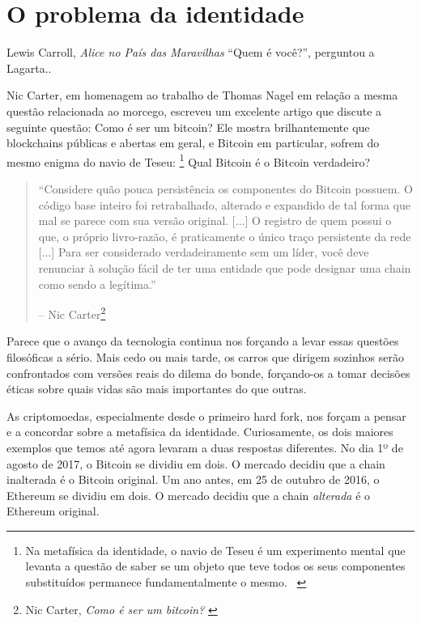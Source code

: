 \chapter{O problema da identidade}
\label{les:4}

\begin{chapquote}{Lewis Carroll, \textit{Alice no País das Maravilhas}}
  \enquote{Quem é você?}, perguntou a Lagarta..
\end{chapquote}

Nic Carter, em homenagem ao trabalho de Thomas Nagel em relação a mesma questão relacionada ao morcego, escreveu um excelente artigo que discute a seguinte questão: Como é ser um bitcoin? Ele mostra brilhantemente que blockchains públicas e abertas em geral, e Bitcoin em particular, sofrem do mesmo enigma do navio de Teseu: \footnote{Na metafísica da identidade, o navio de Teseu é um experimento mental que levanta a questão de saber se um objeto que teve todos os seus componentes substituídos permanece fundamentalmente o mesmo. ~\cite{wiki:theseus}} Qual Bitcoin é o Bitcoin verdadeiro?

\begin{quotation}\begin{samepage}
\enquote{Considere quão pouca persistência os componentes do Bitcoin possuem. O código base inteiro foi retrabalhado, alterado e expandido de tal forma que mal se parece com sua versão original. [...] O registro de quem possui o que, o próprio livro-razão, é praticamente o único traço persistente da rede [...] Para ser considerado verdadeiramente sem um líder, você deve renunciar à solução fácil de ter uma entidade que pode designar uma chain como sendo a legítima.}
\begin{flushright} -- Nic Carter\footnote{Nic Carter, \textit{Como é ser um bitcoin?} \cite{bitcoin-identity}}
\end{flushright}\end{samepage}\end{quotation}

Parece que o avanço da tecnologia continua nos forçando a levar essas questões filosóficas a sério. Mais cedo ou mais tarde, os carros que dirigem sozinhos serão confrontados com versões reais do dilema do bonde, forçando-os a tomar decisões éticas sobre quais vidas são mais importantes do que outras.

As criptomoedas, especialmente desde o primeiro hard fork, nos forçam a pensar e a concordar sobre a metafísica da identidade. Curiosamente, os dois maiores exemplos que temos até agora levaram a duas respostas diferentes. No dia 1º de agosto de 2017, o Bitcoin se dividiu em dois. O mercado decidiu que a chain inalterada é o Bitcoin original. Um ano antes, em 25 de outubro de 2016, o Ethereum se dividiu em dois. O mercado decidiu que a chain \textit{alterada} é o Ethereum original.

